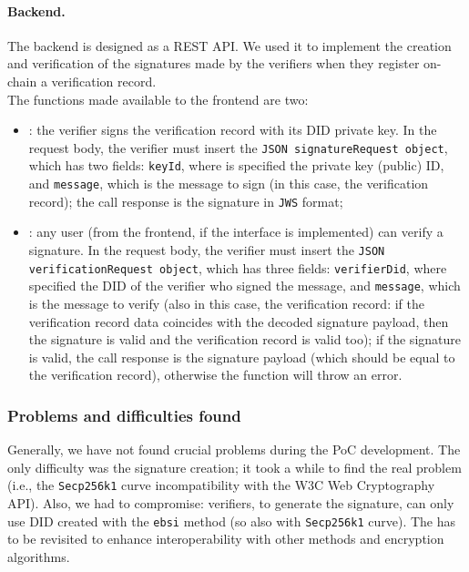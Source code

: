 \paragraph{Backend.}
The backend is designed as a REST API. We used it to implement the creation 
and verification of the signatures made by the verifiers when they register 
on-chain a verification record.
\vspace{0.3cm}\\
The functions made available to the frontend are two:
\begin{itemize}
    \item {}: the verifier signs the verification record
    with its DID private key. In the request body, the verifier must insert the
    \texttt{JSON signatureRequest object}, which has two fields: \texttt{keyId},
    where is specified the private key (public) ID, and \texttt{message},
    which is the message to sign (in this case, the verification record);
    the call response is the signature in \texttt{JWS} format;
    \item {}: any user (from the frontend, if the
    interface is implemented) can verify a signature. In the request body, the
    verifier must insert the \texttt{JSON verificationRequest object}, which has
    three fields: \texttt{verifierDid}, where specified the DID of the
    verifier who signed the message, and \texttt{message}, which is the
    message to verify (also in this case, the verification record: if the
    verification record data coincides with the decoded signature payload,
    then the signature is valid and the verification record is valid too);
    if the signature is valid, the call response is the signature payload (which
    should be equal to the verification record), otherwise the function
    will throw an error.
\end{itemize}

\subsubsection{Problems and difficulties found}
Generally, we have not found crucial problems during the PoC development. The only 
difficulty was the signature creation; it took a while to find the real 
problem (i.e., the \texttt{Secp256k1} curve incompatibility with the W3C Web 
Cryptography API). Also, we had to compromise: verifiers, to generate the signature, 
can only use DID created with the \texttt{ebsi} method (so also with \texttt{Secp256k1}
curve). The  has to be revisited to enhance interoperability
with other methods and encryption algorithms.

